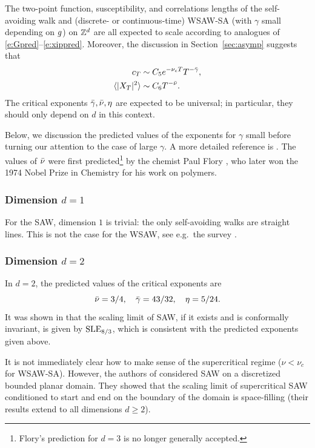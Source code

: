 The two-point function, susceptibility, and correlations lengths of the
self-avoiding walk and (discrete- or continuous-time) WSAW-SA (with $\gamma$ small
depending on $g$) on ${ {{\mathbb Z}}^d }$ are all expected
to scale according to analogues of \eqref{e:Gpred}--\eqref{e:xippred}.
Moreover, the discussion in Section~\ref{sec:asymp} suggests that
\begin{align}
\label{e:cT-asymp}
c_T                       &\sim C_5 e^{-\nu_c T} T^{-\bar\gamma}, \\
\label{e:XT-asymp}
\langle |X_T|^2 \rangle   &\sim C_6 T^{-\bar\nu}.
\end{align}
The critical exponents $\bar\gamma, \bar\nu, \eta$ are expected to be universal;
in particular, they should only depend on $d$ in this context.

Below, we discussion the predicted values of the exponents for $\gamma$ small before
turning our attention to the case of large $\gamma$. A more detailed reference is
\cite{MS93}. The values of $\bar\nu$ were first predicted\footnote{Flory's prediction
for $d = 3$ is no longer generally accepted.} by the chemist Paul Flory \cite{Flor49}, who
later won the 1974 Nobel Prize in Chemistry for his work on polymers.

\subsubsection{Dimension $d = 1$}

For the SAW, dimension $1$ is trivial: the only self-avoiding walks are straight
lines. This is not the case for the WSAW, see e.g.\ the survey \cite{HK01}.

\subsubsection{Dimension $d = 2$}

In $d = 2$, the predicted values of the critical exponents are
\begin{equation}
\bar\nu = 3/4, \quad \bar\gamma = 43/32, \quad \eta = 5/24.
\end{equation}
It was shown in \cite{LSW04} that the scaling limit of SAW, if it exists and
is conformally invariant, is given by ${\rm SLE}_{8/3}$, which is consistent with
the predicted exponents given above.

It is not immediately clear how to make sense of the supercritical regime
($\nu < \nu_c$ for WSAW-SA).
However, the authors of \cite{LSW04} considered SAW on a discretized bounded
planar domain. They showed that the scaling limit of supercritical
SAW conditioned to start and end on the boundary of the domain is space-filling
(their results extend to all dimensions $d \ge 2$).

